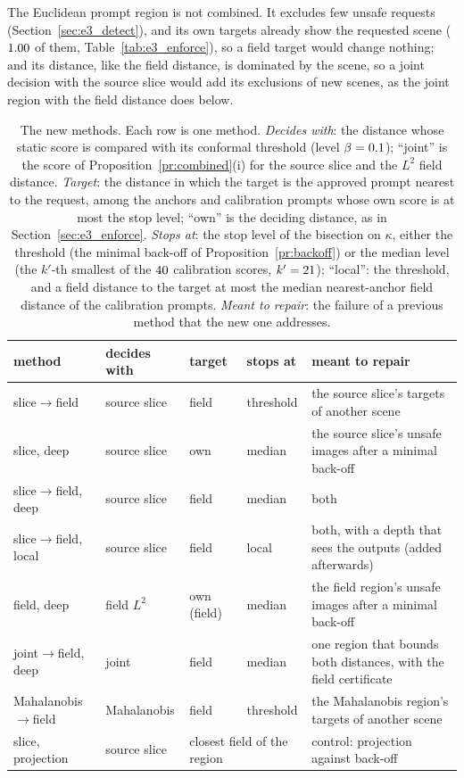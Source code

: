 \documentclass{article}
\theoremstyle{plain}
\theoremstyle{remark}
\begin{document}
The Euclidean prompt region is not combined. It excludes few unsafe requests (Section~\ref{sec:e3_detect}), and its own targets
already show the requested scene ($1.00$ of them, Table~\ref{tab:e3_enforce}), so a field target would change nothing; and
its distance, like the field distance, is dominated by the scene, so a joint decision with the source slice would add its exclusions
of new scenes, as the joint region with the field distance does below.

\begin{table}[!htbp]
\centering
\caption{The new methods. Each row is one method. \emph{Decides with}: the distance whose static score is compared with its
conformal threshold (level $\beta=0.1$); ``joint'' is the score of Proposition~\ref{pr:combined}(i) for the source slice and the
$L^2$ field distance. \emph{Target}: the distance in which the target is the approved prompt nearest to the request, among the anchors
and calibration prompts whose own score is at most the stop level; ``own'' is the deciding distance, as in
Section~\ref{sec:e3_enforce}. \emph{Stops at}: the stop level of the bisection on $\kappa$, either the threshold (the minimal
back-off of Proposition~\ref{pr:backoff}) or the median level (the $k'$-th smallest of the $40$ calibration scores,
$k'=21$);
``local'': the threshold, and a field distance to the target at most the median nearest-anchor field distance of the calibration
prompts.
\emph{Meant to repair}: the failure of a previous method that the new one addresses.}
\label{tab:e3c_methods}
\small
\begin{tabular}{l l l l p{5.6cm}}
\toprule
method & decides with & target & stops at & meant to repair\\
\midrule
slice$\to$field & source slice & field & threshold & the source slice's targets of another scene\\
slice, deep & source slice & own & median & the source slice's unsafe images after a minimal back-off\\
slice$\to$field, deep & source slice & field & median & both\\
slice$\to$field, local & source slice & field & local & both, with a depth that sees the outputs (added afterwards)\\
field, deep & field $L^2$ & own (field) & median & the field region's unsafe images after a minimal back-off\\
joint$\to$field, deep & joint & field & median & one region that bounds both distances, with the field certificate\\
Mahalanobis$\to$field & Mahalanobis & field & threshold & the Mahalanobis region's targets of another scene\\
slice, projection & source slice & \multicolumn{2}{l}{closest field of the region} & control: projection against back-off\\
\bottomrule
\end{tabular}
\end{table}
\end{document}
